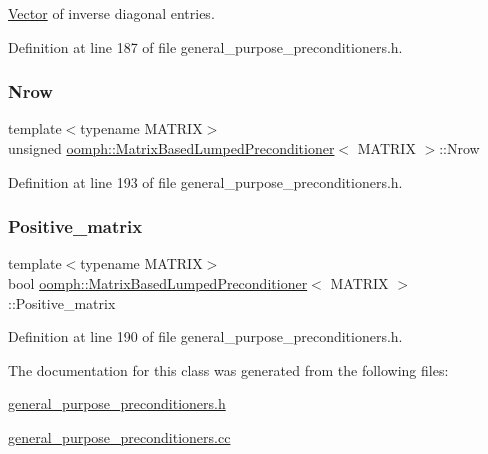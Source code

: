 \hyperlink{classoomph_1_1Vector}{Vector} of inverse diagonal entries. 



Definition at line 187 of file general\+\_\+purpose\+\_\+preconditioners.\+h.

\mbox{\label{classoomph_1_1MatrixBasedLumpedPreconditioner_a6aa1a6b695761df04e32db3563b89272}} 
\subsubsection{\texorpdfstring{Nrow}{Nrow}}
{\footnotesize\ttfamily template$<$typename M\+A\+T\+R\+IX$>$ \\
unsigned \hyperlink{classoomph_1_1MatrixBasedLumpedPreconditioner}{oomph\+::\+Matrix\+Based\+Lumped\+Preconditioner}$<$ M\+A\+T\+R\+IX $>$\+::Nrow\hspace{0.3cm}{\ttfamily [private]}}



Definition at line 193 of file general\+\_\+purpose\+\_\+preconditioners.\+h.

\mbox{\label{classoomph_1_1MatrixBasedLumpedPreconditioner_adfbe26d10029d211744f2dd6ea1508ef}} 
\subsubsection{\texorpdfstring{Positive\+\_\+matrix}{Positive\_matrix}}
{\footnotesize\ttfamily template$<$typename M\+A\+T\+R\+IX$>$ \\
bool \hyperlink{classoomph_1_1MatrixBasedLumpedPreconditioner}{oomph\+::\+Matrix\+Based\+Lumped\+Preconditioner}$<$ M\+A\+T\+R\+IX $>$\+::Positive\+\_\+matrix\hspace{0.3cm}{\ttfamily [private]}}



Definition at line 190 of file general\+\_\+purpose\+\_\+preconditioners.\+h.



The documentation for this class was generated from the following files\+:\begin{DoxyCompactItemize}
\item 
\hyperlink{general__purpose__preconditioners_8h}{general\+\_\+purpose\+\_\+preconditioners.\+h}\item 
\hyperlink{general__purpose__preconditioners_8cc}{general\+\_\+purpose\+\_\+preconditioners.\+cc}\end{DoxyCompactItemize}
